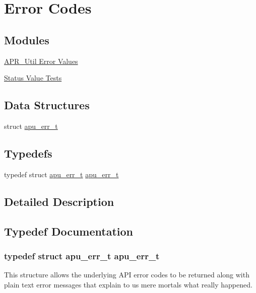 \hypertarget{group__apu__errno}{\section{Error Codes}
\label{group__apu__errno}
}
\subsection*{Modules}
\begin{DoxyCompactItemize}
\item 
\hyperlink{group___a_p_r___util___error}{A\-P\-R\-\_\-\-Util Error Values}
\item 
\hyperlink{group___a_p_u___s_t_a_t_u_s___i_s}{Status Value Tests}
\end{DoxyCompactItemize}
\subsection*{Data Structures}
\begin{DoxyCompactItemize}
\item 
struct \hyperlink{structapu__err__t}{apu\-\_\-err\-\_\-t}
\end{DoxyCompactItemize}
\subsection*{Typedefs}
\begin{DoxyCompactItemize}
\item 
typedef struct \hyperlink{structapu__err__t}{apu\-\_\-err\-\_\-t} \hyperlink{group__apu__errno_ga5871eecd18a15baa660bb5769e32b097}{apu\-\_\-err\-\_\-t}
\end{DoxyCompactItemize}


\subsection{Detailed Description}


\subsection{Typedef Documentation}
\hypertarget{group__apu__errno_ga5871eecd18a15baa660bb5769e32b097}{
\subsubsection[{apu\-\_\-err\-\_\-t}]{\setlength{\rightskip}{0pt plus 5cm}typedef struct {\bf apu\-\_\-err\-\_\-t}  {\bf apu\-\_\-err\-\_\-t}}}\label{group__apu__errno_ga5871eecd18a15baa660bb5769e32b097}
This structure allows the underlying A\-P\-I error codes to be returned along with plain text error messages that explain to us mere mortals what really happened. 